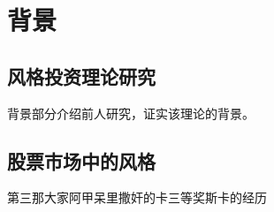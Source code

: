\section{背景}
\subsection{风格投资理论研究}
    背景部分介绍前人研究，证实该理论的背景。
\subsection{股票市场中的风格}
    第三那大家阿甲呆里撒奸的卡三等奖斯卡的经历
